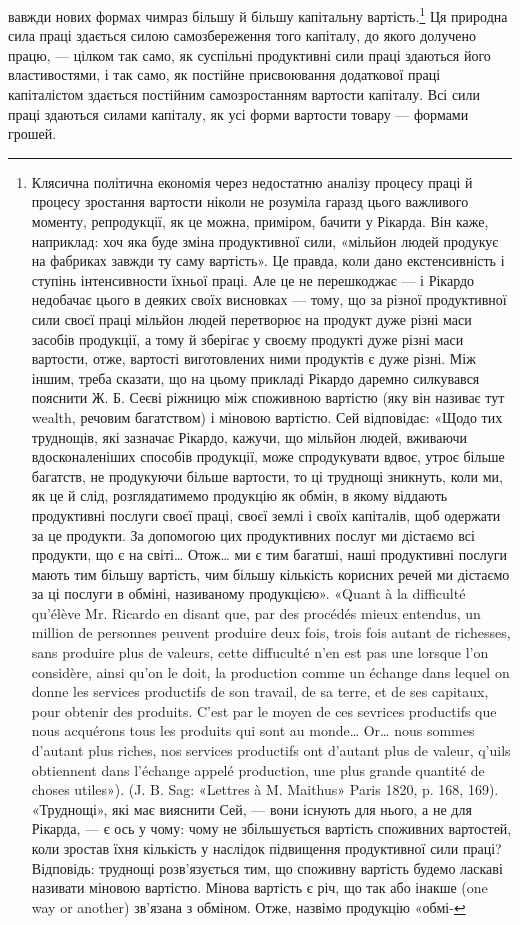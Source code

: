 вавжди нових формах чимраз більшу й більшу капітальну вартість.\footnote{
Клясична політична економія через недостатню аналізу процесу
праці й процесу зростання вартости ніколи не розуміла гаразд цього
важливого моменту, репродукції, як це можна, приміром, бачити у Рікарда.
Він каже, наприклад: хоч яка буде зміна продуктивної сили,
«мільйон людей продукує на фабриках завжди ту саму вартість». Це
правда, коли дано екстенсивність і ступінь інтенсивности їхньої праці.
Але це не перешкоджає — і Рікардо недобачає цього в деяких своїх висновках
— тому, що за різної продуктивної сили своєї праці мільйон людей
перетворює на продукт дуже різні маси засобів продукції, а тому й зберігає
у своєму продукті дуже різні маси вартости, отже, вартості виготовлених
ними продуктів є дуже різні. Між іншим, треба сказати, що на цьому
прикладі Рікардо даремно силкувався пояснити Ж. Б. Сеєві ріжницю
між споживною вартістю (яку він називає тут wealth, речовим багатством)
і міновою вартістю. Сей відповідає: «Щодо тих труднощів, які
зазначає Рікардо, кажучи, що мільйон людей, вживаючи вдосконаленіших
способів продукції, може спродукувати вдвоє, утроє більше багатств,
не продукуючи більше вартости, то ці труднощі зникнуть, коли ми, як
це й слід, розглядатимемо продукцію як обмін, в якому віддають продуктивні
послуги своєї праці, своєї землі і своїх капіталів, щоб одержати
за це продукти. За допомогою цих продуктивних послуг ми дістаємо всі
продукти, що є на світі\dots{} Отож\dots{} ми є тим багатші, наші продуктивні
послуги мають тим більшу вартість, чим більшу кількість корисних
речей ми дістаємо за ці послуги в обміні, називаному продукцією».
«Quant à la difficulté qu’élève Mr. Ricardo en disant que, par des procédés
mieux entendus, un million de personnes peuvent produire deux fois,
trois fois autant de richesses, sans produire plus de valeurs, cette diffuculté
n’en est pas une lorsque l’on considère, ainsi qu’on le doit, la production
comme un échange dans lequel on donne les services productifs de son travail,
de sa terre, et de ses capitaux, pour obtenir des produits. C’est par
le moyen de ces sevrices productifs que nous acquérons tous les produits
qui sont au monde\dots{} Or\dots{} nous sommes d’autant plus riches, nos services
productifs ont d’autant plus de valeur, q’uils obtiennent dans l’échange
appelé production, une plus grande quantité de choses utiles»). (J. B. Sag:
«Lettres à M. Maithus» Paris 1820, p. 168, 169). «Труднощі», які має
вияснити Сей, — вони існують для нього, а не для Рікарда, — є ось у
чому: чому не збільшується вартість споживних вартостей, коли зростав
їхня кількість у наслідок підвищення продуктивної сили праці? Відповідь:
труднощі розв’язується тим, що споживну вартість будемо ласкаві
називати міновою вартістю. Мінова вартість є річ, що так або інакше
(one way or another) зв’язана з обміном. Отже, назвімо продукцію «обмі-
} Ця природна сила праці здається силою самозбереження
того капіталу, до якого долучено працю, — цілком так само,
як суспільні продуктивні сили праці здаються його властивостями,
і так само, як постійне присвоювання додаткової праці
капіталістом здається постійним самозростанням вартости капіталу.
Всі сили праці здаються силами капіталу, як усі форми
вартости товару — формами грошей.

